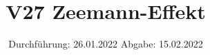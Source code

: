 

\subject{Fortgeschrittenenpraktikum}
\title{V27 Zeemann-Effekt}
\date{%
  Durchführung: 26.01.2022
  \hspace{3em}
  Abgabe: 15.02.2022
}



\maketitle
\thispagestyle{empty}
\tableofcontents
\newpage








\printbibliography{}




